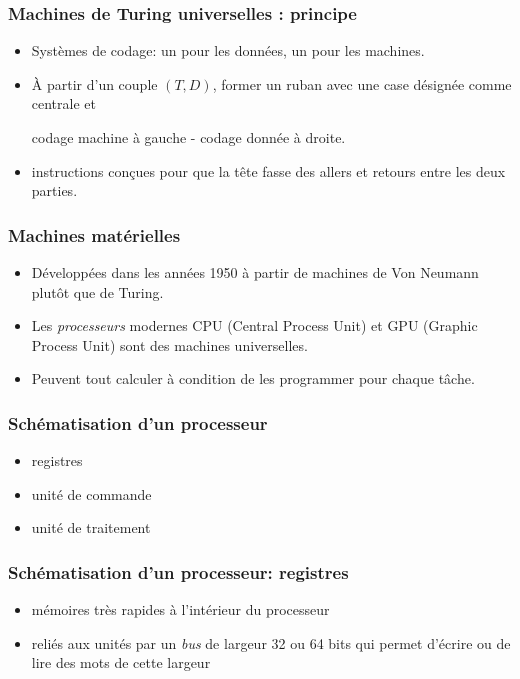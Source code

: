 \begin{frame}
  \frametitle{Machines de Turing universelles : principe}
\begin{itemize}
  \item  Systèmes de codage: un pour les données, un pour les machines.
  \item \`A partir d'un couple $(T,D)$, former un ruban avec une case désignée comme centrale et 
  \begin{center}
    codage machine à gauche  -  codage donnée à droite.
  \end{center}
  \item  instructions conçues pour que la tête fasse des allers et retours entre les deux parties.
\end{itemize}
\end{frame}

\begin{frame}
  \frametitle{Machines matérielles}
\begin{itemize}
  \item Développées dans les années 1950 à partir de machines de Von Neumann plutôt que de Turing.
  \item Les \emph{processeurs} modernes CPU (Central Process Unit) et GPU (Graphic Process Unit) sont des machines universelles.
  \item Peuvent tout calculer à condition de les programmer pour chaque tâche.
\end{itemize}
\end{frame}

\begin{frame}
  \frametitle{Schématisation d'un processeur}
\begin{itemize}
  \item registres
  \item unité de commande
  \item unité de traitement
\end{itemize}
\end{frame}

\begin{frame}
  \frametitle{Schématisation d'un processeur: registres}
\begin{itemize}
  \item mémoires très rapides à l'intérieur du processeur
  \item reliés aux unités par un \emph{bus} de largeur 32 ou 64 bits qui permet d'écrire ou de lire des mots de cette largeur
\end{itemize}
\end{frame}

